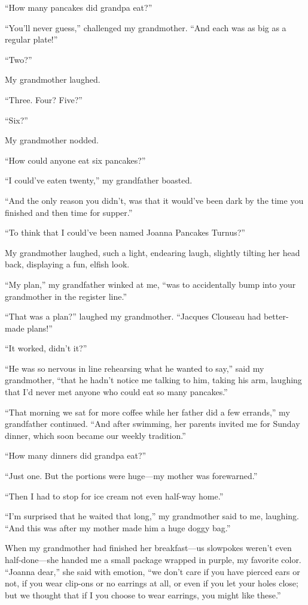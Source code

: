 ``How many pancakes did grandpa eat?''

``You'll never guess,'' challenged my grandmother. ``And each was as big
as a regular plate!''

``Two?''

My grandmother laughed.

``Three. Four? Five?''

``Six?''

My grandmother nodded.

``How could anyone eat six pancakes?''

``I could've eaten twenty,'' my grandfather boasted.

``And the only reason you didn't, was that it would've been dark by the
time you finished and then time for supper.''

``To think that I could've been named Joanna Pancakes Turnus?''

My grandmother laughed, such a light, endearing laugh, slightly tilting
her head back, displaying a fun, elfish look.

``My plan,'' my grandfather winked at me, ``was to accidentally bump
into your grandmother in the register line.''

``That was a plan?'' laughed my grandmother. ``Jacques Clouseau had
better-made plans!''

``It worked, didn't it?''

``He was so nervous in line rehearsing what he wanted to say,'' said my
grandmother, ``that he hadn't notice me talking to him, taking his arm,
laughing that I'd never met anyone who could eat so many pancakes.''

``That morning we sat for more coffee while her father did a few
errands,'' my grandfather continued. ``And after swimming, her parents
invited me for Sunday dinner, which soon became our weekly tradition.''

``How many dinners did grandpa eat?''

``Just one. But the portions were huge---my mother was forewarned.''

``Then I had to stop for ice cream not even half-way home.''

``I'm surprised that he waited that long,'' my grandmother said to me,
laughing. ``And this was after my mother made him a huge doggy bag.''

When my grandmother had finished her breakfast---us slowpokes weren't
even half-done---she handed me a small package wrapped in purple, my
favorite color. ``Joanna dear,'' she said with emotion, ``we don't care
if you have pierced ears or not, if you wear clip-ons or no earrings at
all, or even if you let your holes close; but we thought that if I you
choose to wear earrings, you might like these.''

